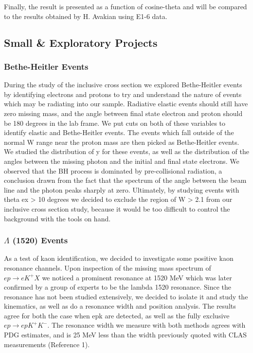 Finally, the result is presented as a function of cosine-theta and will be compared to the results obtained by H. Avakian using E1-6 data. 

\subsection{Small \& Exploratory Projects}
\subsubsection{Bethe-Heitler Events}
During the study of the inclusive cross section we explored Bethe-Heitler events by identifying electrons and protons to try and understand the nature of events which may be radiating into our sample.  Radiative elastic events should still have zero missing mass, and the angle between final state electron and proton should be 180 degrees in the lab frame.  We put cuts on both of these variables to identify elastic and Bethe-Heitler events.  The events which fall outside of the normal W range near the proton mass are then picked as Bethe-Heitler events.  We studied the distribution of y for these events, as well as the distribution of the angles between the missing photon and the initial and final state electrons.  We observed that the BH process is dominated by pre-collisional radiation, a conclusion drawn from the fact that the spectrum of the angle between the beam line and the photon peaks sharply at zero.  Ultimately, by studying events with theta ex > 10 degrees we decided to exclude the region of W > 2.1 from our inclusive cross section study, because it would be too difficult to control the background with the tools on hand.    

\subsubsection{$\Lambda$ (1520) Events}
As a test of kaon identification, we decided to investigate some positive kaon resonance channels.  Upon inspection of the missing mass spectrum of $e p \rightarrow e K^{+} X$ we noticed a prominent resonance at 1520 MeV which was later confirmed by a group of experts to be the lambda 1520 resonance.  Since the resonance has not been studied extensively, we decided to isolate it and study the kinematics, as well as do a resonance width and position analysis.  The results agree for both the case when epk are detected, as well as the fully exclusive $e p \rightarrow e p K^{+} K^{-}$.  The resonance width we measure with both methods agrees with PDG estimates, and is 25 MeV less than the width previously quoted with CLAS measurements (Reference 1).


